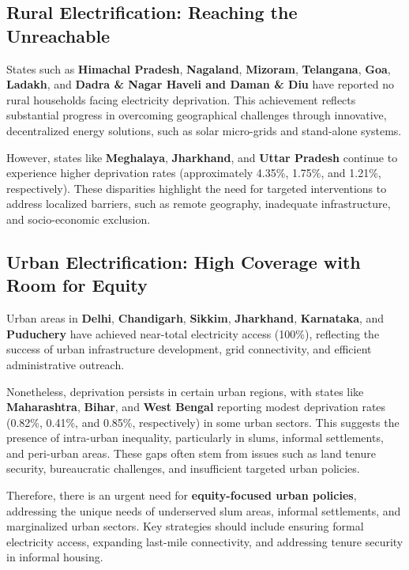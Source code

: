 \documentclass{article}
\begin{document}
\subsection*{Rural Electrification: Reaching the Unreachable}

States such as \textbf{Himachal Pradesh}, \textbf{Nagaland}, \textbf{Mizoram}, \textbf{Telangana}, \textbf{Goa}, \textbf{Ladakh}, and \textbf{Dadra \& Nagar Haveli and Daman \& Diu} have reported no rural households facing electricity deprivation. This achievement reflects substantial progress in overcoming geographical challenges through innovative, decentralized energy solutions, such as solar micro-grids and stand-alone systems.

However, states like \textbf{Meghalaya}, \textbf{Jharkhand}, and \textbf{Uttar Pradesh} continue to experience higher deprivation rates (approximately 4.35\%, 1.75\%, and 1.21\%, respectively). These disparities highlight the need for targeted interventions to address localized barriers, such as remote geography, inadequate infrastructure, and socio-economic exclusion. 

\subsection*{Urban Electrification: High Coverage with Room for Equity}

Urban areas in \textbf{Delhi}, \textbf{Chandigarh}, \textbf{Sikkim}, \textbf{Jharkhand}, \textbf{Karnataka}, and \textbf{Puduchery} have achieved near-total electricity access (100\%), reflecting the success of urban infrastructure development, grid connectivity, and efficient administrative outreach. 

Nonetheless, deprivation persists in certain urban regions, with states like \textbf{Maharashtra}, \textbf{Bihar}, and \textbf{West Bengal} reporting modest deprivation rates (0.82\%, 0.41\%, and 0.85\%, respectively) in some urban sectors. This suggests the presence of intra-urban inequality, particularly in slums, informal settlements, and peri-urban areas. These gaps often stem from issues such as land tenure security, bureaucratic challenges, and insufficient targeted urban policies.

Therefore, there is an urgent need for \textbf{equity-focused urban policies}, addressing the unique needs of underserved slum areas, informal settlements, and marginalized urban sectors. Key strategies should include ensuring formal electricity access, expanding last-mile connectivity, and addressing tenure security in informal housing.
\end{document}
